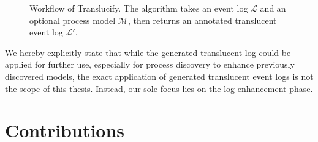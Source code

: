 \begin{figure}[H]
    \centering
    \caption{Workflow of Translucify. The algorithm takes an event log $\mathcal{L}$ and an optional process model $\mathcal{M}$, then returns an annotated translucent event log $\mathcal{L'}$.}
    \label{fig:translucify_workflow}
\end{figure}

We hereby explicitly state that while the generated translucent log could be applied for further use, especially for process discovery to enhance previously discovered models, the exact application of generated translucent event logs is not the scope of this thesis. Instead, our sole focus lies on the log enhancement phase.

\section{Contributions}
\begin{comment}
    In this section, you list the contributions that your thesis makes to our wonderful world (of science).
Again, there is a strong link to the previous section.
Usually, you have achieved your research goals.
Hence, the contributions are concrete statements of the goals you have achieved.
Additionally, your evaluation (most likely also stressed as a goal) is a contribution.
Any implementation or prototype can also be quantified as a contribution.

Some examples:
\begin{itemize}
	\item A systematic literature review covering 35 articles on noise patterns in real event data
	\item A noise detection algorithm based on dynamic programming and symbolic linking
	\item ...
\end{itemize}
\end{comment}


